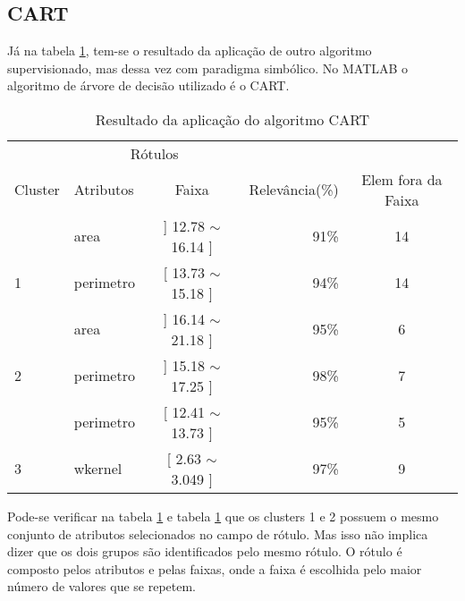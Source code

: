 \subsection{CART}

Já na tabela \ref{tab:rot:seeds:cart}, tem-se o resultado da aplicação de outro algoritmo supervisionado, mas dessa vez com paradigma simbólico. No MATLAB o algoritmo de árvore de decisão utilizado é o CART. 

\begin{table}[!h]
\centering
\caption{Resultado da aplicação do algoritmo CART}
\label{tab:rot:seeds:cart}
\begin{tabular}{llcrc}\hline\hline 

\multicolumn{1}{c}{\cellcolor[HTML]{FFFFFF}} & \multicolumn{2}{c}{Rótulos}                      & \multicolumn{1}{r}{}            \\ \cline{2-3}
Cluster                                      & Atributos      & \multicolumn{1}{c}{Faixa}       & \multicolumn{1}{c}{Relevância(\%)} & Elem fora da Faixa \\ \hline \hline
                                             & area           & ] 12.78 $\sim$  16.14 ]         & 91\%          & 14 \\  
\multirow{-2}{*}{1}                          & perimetro      & [ 13.73 $\sim$ 15.18 ]          & 94\%          & 14\\ \hline
                                             & area           & ] 16.14 $\sim$  21.18 ]          & 95\%         & 6 \\ 
\multirow{-2}{*}{2}                          & perimetro      & ] 15.18 $\sim$  17.25 ]          & 98\%         & 7\\  \hline
                                             & perimetro      & [ 12.41 $\sim$  13.73 ]         & 95\%          & 5 \\
\multirow{-2}{*}{3}                          & wkernel        & [ 2.63 $\sim$  3.049 ]         & 97\%           & 9\\ \hline \hline
\end{tabular}
\end{table}

Pode-se verificar na tabela \ref{tab:rot:seeds:cart} e tabela \ref{tab:rot:seeds:cart} que os clusters 1 e 2 possuem o mesmo conjunto de atributos selecionados no campo de rótulo. Mas isso não implica dizer que os dois grupos são identificados pelo mesmo rótulo. O rótulo é composto pelos atributos e pelas faixas, onde a faixa é escolhida pelo maior número de valores que se repetem. 

